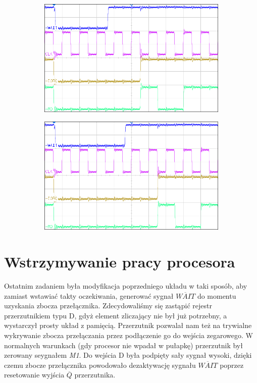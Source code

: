 \documentclass[fleqn]{article}
\begin{document}
\begin{figure}[H]
\begin{subfigure}[b]{0.49\textwidth}
		\caption{}
	\end{subfigure}
	\begin{subfigure}[b]{0.49\textwidth}
		\includegraphics[width=\textwidth]{img/2d.png}
		\caption{}
	\end{subfigure}
	\begin{subfigure}[b]{0.49\textwidth}
		\includegraphics[width=\textwidth]{img/2e.png}
		\caption{}
	\end{subfigure}
	\caption{}
\end{figure}

\section{Wstrzymywanie pracy procesora}

Ostatnim zadaniem była modyfikacja poprzedniego układu w taki sposób, aby zamiast wstawiać takty oczekiwania, generować sygnał $\overline{WAIT}$ do momentu uzyskania zbocza przełącznika.
Zdecydowaliśmy się zastąpić rejestr przerzutnikiem typu D, gdyż element zliczający nie był już potrzebny, a wystarczył prosty układ z pamięcią. Przerzutnik pozwalał nam też na trywialne wykrywanie zbocza przełączania przez podłączenie go do wejścia zegarowego.
W normalnych warunkach (gdy procesor nie wpadał w pułapkę) przerzutnik był zerowany seygnałem \textit{M1}. Do wejścia D była podpięty sały sygnał wysoki, dzięki czemu zbocze przełącznika powodowało dezaktywację sygnału $\overline{WAIT}$ poprzez resetowanie wyjścia $\overline{Q}$ przerzutnika.
\end{document}
